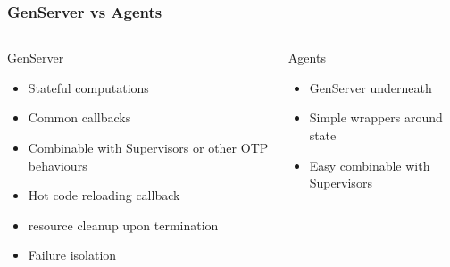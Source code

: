 \begin{frame}
    \frametitle{GenServer vs Agents}
    \begin{columns}
        \begin{column}[T]{0.5\textwidth}
            GenServer
            \vfill
            \begin{itemize}
                \small
                \item Stateful computations
                \item Common callbacks
                \item Combinable with Supervisors or other OTP behaviours
                \item Hot code reloading callback
                \item resource cleanup upon termination
                \item Failure isolation
            \end{itemize}
        \end{column}
        \begin{column}[T]{0.5\textwidth}
            Agents
            \begin{itemize}
                \small
                \item GenServer underneath
                \item Simple wrappers around state
                \item Easy combinable with Supervisors
            \end{itemize}
        \end{column}
    \end{columns}
\end{frame}

